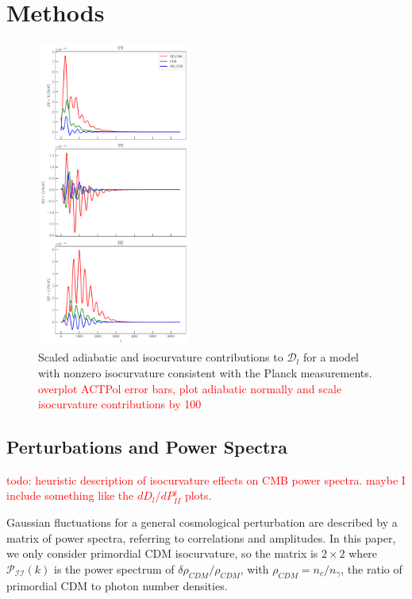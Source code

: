 \documentclass{emulateapj}
\newcommand\writingnote[1]{\textcolor{red}{#1}}
\newcommand{\pii}{ \mathcal{P}_{\mathcal{I}\mathcal{I}} }
\begin{document}
\section{Methods}\label{methods}

\begin{figure}[h]
\includegraphics[width=0.45\textwidth]{figures/isocurvature_fiducial_spectra_contributions.pdf}
\caption{Scaled adiabatic and isocurvature contributions to $\mathcal{D}_l$ for a model with nonzero isocurvature consistent with the Planck measurements. \writingnote{overplot ACTPol error bars, plot adiabatic normally and scale isocurvature contributions by 100}\label{fig:effects}}
\end{figure}


\subsection{Perturbations and Power Spectra}\label{powerspectra}

\writingnote{
todo: heuristic description of isocurvature effects on CMB power spectra. maybe I include something like the $dD_l/dP_{II}^j$ plots.
}


Gaussian fluctuations for a general cosmological perturbation are described by a matrix of power spectra, referring to correlations and amplitudes. In this paper, we only consider primordial CDM isocurvature, so the matrix is $2 \times 2$ where $\pii(k)$ is the power spectrum of $\delta \rho_{CDM} / \rho_{CDM}$, with $\rho_{CDM} = n_c / n_{\gamma}$, the ratio of primordial CDM to photon number densities.
\end{document}
